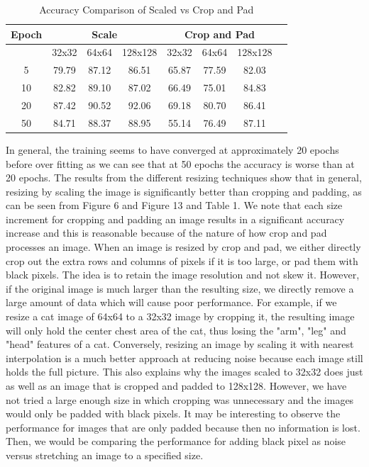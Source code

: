 \documentclass{article}
\begin{document}
\begin{table}[ht]
	\caption{Accuracy Comparison of Scaled vs Crop and Pad} %
	\centering %
	\begin{tabular}{c c c c c c c c} %
		\hline\hline %
		
		Epoch &  \multicolumn{3}{c}{Scale} & \multicolumn{3}{c}{Crop and Pad}\\
		\hline
		
		{} & 32x32 & 64x64 & 128x128 & 32x32 & 64x64 & 128x128 \\ [0.5ex] %
		\hline %
		5 & 79.79 & 87.12 & 86.51 & 65.87 & 77.59 & 82.03\\
		10 & 82.82 & 89.10 & 87.02 & 66.49 & 75.01 & 84.83\\
		20 & 87.42 & 90.52 & 92.06 & 69.18 & 80.70 & 86.41\\
		50 & 84.71& 88.37 & 88.95 & 55.14 & 76.49 & 87.11\\ [1ex] %
		\hline %
	\end{tabular}
	\label{table:scale_cp} %
\end{table}
In general, the training seems to have converged at approximately 20 epochs before over fitting as we can see that at 50 epochs the accuracy is worse than at 20 epochs. 
The results from the different resizing techniques show that in general, resizing by scaling the image is significantly better than cropping and padding, as can be seen from Figure 6 and Figure 13 and Table 1. We note that each size increment for cropping and padding an image results in a significant accuracy increase and this is reasonable because of the nature of how crop and pad processes an image. When an image is resized by crop and pad, we either directly crop out the extra rows and columns of pixels if it is too large, or pad them with black pixels. The idea is to retain the image resolution and not skew it. However, if the original image is much larger than the resulting size, we directly remove a large amount of data which will cause poor performance. For example, if we resize a cat image of 64x64 to a 32x32 image by cropping it, the resulting image will only hold the center chest area of the cat, thus losing the "arm", "leg" and "head" features of a cat. Conversely, resizing an image by scaling it with nearest interpolation is a much better approach at reducing noise because each image still holds the full picture. This also explains why the images scaled to 32x32 does just as well as an image that is cropped and padded to 128x128. However, we have not tried a large enough size in which cropping was unnecessary and the images would only be padded with black pixels. It may be interesting to observe the performance for images that are only padded because then no information is lost. Then, we would be comparing the performance for adding black pixel as noise versus stretching an image to a specified size. 
\end{document}
